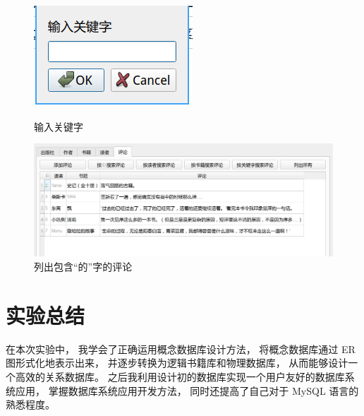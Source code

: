 \documentclass[12pt,onecolumn]{report}
\theoremstyle{plain}
\numberwithin{figure}{chapter}
\numberwithin{table}{chapter}
\numberwithin{lstlisting}{chapter}
\begin{document}
\begin{figure}[ht]
  \centering
  \begin{minipage}{0.45\linewidth}
    \centering
    \includegraphics{figures/input-keyword.png}
    \caption{输入关键字}\label{fig:input-keyword}
  \end{minipage}
  \begin{minipage}{0.45\linewidth}
    \centering
    \includegraphics[width=\linewidth]{figures/comment-list.png}
    \caption{列出包含``的''字的评论}\label{fig:comment-list}
  \end{minipage}
\end{figure}

\chapter{实验总结}
在本次实验中，
我学会了正确运用概念数据库设计方法，
将概念数据库通过 ER 图形式化地表示出来，
并逐步转换为逻辑书籍库和物理数据库，
从而能够设计一个高效的关系数据库。
之后我利用设计初的数据库实现一个用户友好的数据库系统应用，
掌握数据库系统应用开发方法，
同时还提高了自己对于 MySQL 语言的熟悉程度。
\end{document}
